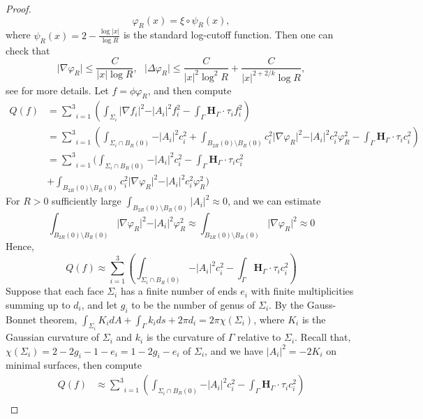 \documentclass[10pt,a4paper]{amsart}
\theoremstyle{theorem}
\theoremstyle{definition}
\numberwithin{equation}{section}
\providecommand{\bold}{\mathbf}
\begin{document}
\begin{proof}
$$
\varphi_R(x)=\xi\circ \psi_R(x),
$$
where $\psi_R(x)=2-\frac{\log\vert x\vert}{\log R}$ is the standard log-cutoff function. Then one can check that
$$
\vert \nabla \varphi_R\vert \leq \frac{C}{\vert x\vert \log R},\ \ \ \vert \Delta \varphi_R \vert \leq \frac{C}{\vert x\vert^2 \log^2R}+\frac{C}{\vert x\vert^{2+2/k}\log R},
$$
see \cite{chodosh2023topology} for more details. 
Let $f=\phi \varphi_R$, and then compute
\begin{equation}
\nonumber
\begin{split}
Q(f)&=\underset{i=1}{\overset{3}{\sum}}(\int_{\Sigma_i}\vert \nabla f_i\vert^2 -\vert A_i\vert^2f_i^2 -\int_{\Gamma} \bold{H}_{\Gamma}\cdot \tau_i f_i^2)\\
&=\underset{i=1}{\overset{3}{\sum}}(\int_{\Sigma_i\cap B_R(0)} -\vert A_i\vert^2c_i^2 +\int_{B_{2R}(0)\setminus B_R(0)} c_i^2\vert \nabla \varphi_R \vert^2 -\vert A_i\vert^2c_i^2\varphi_R^2 -\int_{\Gamma} \bold{H}_{\Gamma}\cdot \tau_i c_i^2)\\
&=\underset{i=1}{\overset{3}{\sum}}(\int_{\Sigma_i\cap B_R(0)} -\vert A_i\vert^2c_i^2  -\int_{\Gamma} \bold{H}_{\Gamma}\cdot \tau_i c_i^2\\
&+\int_{B_{2R}(0)\setminus B_R(0)} c_i^2\vert \nabla \varphi_R \vert^2 -\vert A_i\vert^2c_i^2\varphi_R^2)
\end{split}
\end{equation}
For $R>0$ sufficiently large $\int_{B_{2R}(0)\setminus B_R(0)}\vert A_i\vert^2 \approx 0$, and we can estimate
$$
\int_{B_{2R}(0)\setminus B_R(0)} \vert \nabla \varphi_R \vert^2 -\vert A_i\vert^2 \varphi_R^2 \approx \int_{B_{2R}(0)\setminus B_R(0)} \vert \nabla \varphi_R \vert^2 \approx 0
$$
Hence,
$$
Q(f)\approx \underset{i=1}{\overset{3}{\sum}}(\int_{\Sigma_i\cap B_R(0)} -\vert A_i\vert^2c_i^2  -\int_{\Gamma} \bold{H}_{\Gamma}\cdot \tau_i c_i^2)
$$
Suppose that each face $\Sigma_i$ has a finite number of ends $e_i$ with finite multiplicities summing up to $d_i$, and let $g_i$ to be the number of genus of $\Sigma_i$. By the Gauss-Bonnet theorem,
$\int_{\Sigma_i}K_idA+\int_{\Gamma}k_ids + 2\pi d_i=2\pi \chi (\Sigma_i)$, where $K_i$ is the Gaussian curvature of $\Sigma_i$ and $k_i$ is the curvature of $\Gamma$ relative to $\Sigma_i$. Recall that,
$\chi(\Sigma_i )=2-2g_i-1-e_i=1-2g_i-e_i$ of $\Sigma_i$, and we have $\vert A_i\vert^2 =-2K_i$ on minimal surfaces, then compute
\begin{equation}
\nonumber
\begin{split}
Q(f)&\approx \underset{i=1}{\overset{3}{\sum}}(\int_{\Sigma_i\cap B_R(0)} -\vert A_i\vert^2c_i^2  -\int_{\Gamma} \bold{H}_{\Gamma}\cdot \tau_i c_i^2)\\

\end{split}
\end{equation}
\end{proof}
\end{document}
